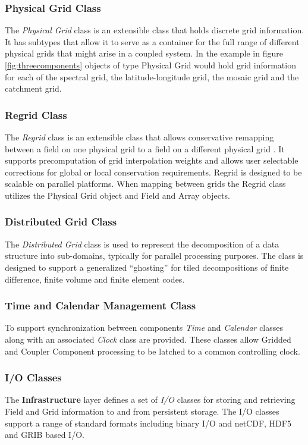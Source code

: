 \subsubsection{Physical Grid Class}
The {\it Physical Grid} class is an extensible class that holds discrete grid information. It has subtypes that allow
it to serve as a container for the full range of different physical grids that might arise in a coupled system.
In the example in figure \ref{fig:threecomponents} objects of type Physical Grid would hold grid information for
each of the spectral grid, the latitude-longitude grid, the mosaic grid and the catchment grid. 

\subsubsection{Regrid Class}
The {\it Regrid} class is an extensible class that allows conservative remapping between a field on one physical grid
to a field on a different physical grid \cite{ref:SCRIP}. It supports precomputation of grid interpolation weights and allows user selectable
corrections for global or local conservation requirements. Regrid is designed to be scalable on parallel platforms.
When mapping between grids
the Regrid class utilizes the Physical Grid object and Field and Array objects.

\subsubsection{Distributed Grid Class}
The {\it Distributed Grid} class is used to represent the decomposition of a data structure into sub-domains, typically for
parallel processing purposes. The class is designed to support a generalized ``ghosting'' for tiled 
decompositions of finite difference, finite volume and finite element codes. 

\subsubsection{Time and Calendar Management Class}
To support synchronization between components {\it Time} and {\it Calendar} classes along with an associated
{\it Clock} class are provided. These classes allow Gridded and Coupler Component processing
to be latched to a common controlling clock.

\subsubsection{I/O Classes}
The {\bf Infrastructure} layer defines a set of {\it I/O} classes for storing and retrieving Field and Grid information
to and from persistent storage. The I/O classes support a range of standard formats including binary I/O and netCDF, HDF5 and
GRIB based I/O.

